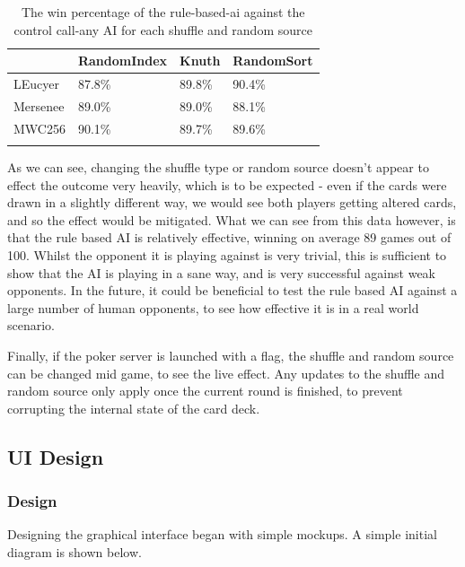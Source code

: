 \begin{table}[H]
    \centering
    \begin{tabular}{l l l l}
    \toprule
                & RandomIndex   & Knuth & RandomSort  \\
    \midrule
    LEucyer     & 87.8\%        & 89.8\%& 90.4\%      \\ \addlinespace
    Mersenee    & 89.0\%        & 89.0\%& 88.1\%      \\ \addlinespace
    MWC256      & 90.1\%        & 89.7\%& 89.6\%      \\ \addlinespace
    \bottomrule
    \end{tabular}
    \caption{The win percentage of the rule-based-ai against the control
             call-any AI for each shuffle and random source}
\end{table}

As we can see, changing the shuffle type or random source doesn't appear to
effect the outcome very heavily, which is to be expected - even if the cards
were drawn in a slightly different way, we would see both players getting
altered cards, and so the effect would be mitigated. What we can see from this
data however, is that the rule based AI is relatively effective, winning on
average 89 games out of 100. Whilst the opponent it is playing against is very
trivial, this is sufficient to show that the AI is playing in a sane way, and
is very successful against weak opponents. In the future, it could be beneficial
to test the rule based AI against a large number of human opponents, to see
how effective it is in a real world scenario.

Finally, if the poker server is launched with a flag, the shuffle and random
source can be changed mid game, to see the live effect. Any updates to the
shuffle and random source only apply once the current round is finished, to
prevent corrupting the internal state of the card deck.

\subsection{UI Design}

\subsubsection{Design}

Designing the graphical interface began with simple mockups. A simple
initial diagram is shown below.

